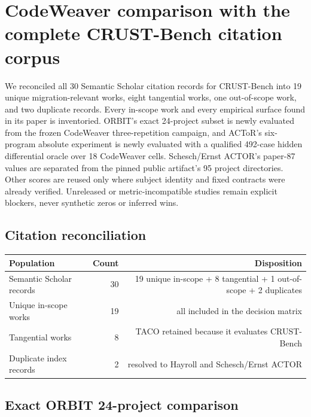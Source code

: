 \documentclass{article}
\begin{document}
\section*{CodeWeaver comparison with the complete CRUST-Bench citation corpus}

We reconciled all 30 Semantic Scholar citation records for CRUST-Bench into 19 unique migration-relevant works, eight tangential works, one out-of-scope work, and two duplicate records. Every in-scope work and every empirical surface found in its paper is inventoried. ORBIT's exact 24-project subset is newly evaluated from the frozen CodeWeaver three-repetition campaign, and ACToR's six-program absolute experiment is newly evaluated with a qualified 492-case hidden differential oracle over 18 CodeWeaver cells. Schesch/Ernst ACTOR's paper-87 values are separated from the pinned public artifact's 95 project directories. Other scores are reused only where subject identity and fixed contracts were already verified. Unreleased or metric-incompatible studies remain explicit blockers, never synthetic zeros or inferred wins.

\subsection*{Citation reconciliation}

\begin{tabular}{lrr}
\toprule
Population & Count & Disposition \\
\midrule
Semantic Scholar records & 30 & 19 unique in-scope + 8 tangential + 1 out-of-scope + 2 duplicates \\
Unique in-scope works & 19 & all included in the decision matrix \\
Tangential works & 8 & TACO retained because it evaluates CRUST-Bench \\
Duplicate index records & 2 & resolved to Hayroll and Schesch/Ernst ACTOR \\
\bottomrule
\end{tabular}

\subsection*{Exact ORBIT 24-project comparison}
\end{document}
